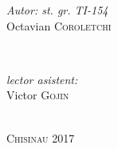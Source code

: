 \begin{titlepage}
\begin{center}
      \begin{minipage}{0.4\textwidth}
      \begin{flushleft} \large
      \emph{Autor: st. gr. TI-154}\\
      Octavian \textsc{Coroletchi}
      \end{flushleft}
      \end{minipage}
      ~
      \begin{minipage}{0.4\textwidth}
      \begin{flushright} \large
      \emph{lector asistent:} \\
      Victor \textsc{Gojin} \\ %
      \end{flushright}
      \end{minipage}\\[70mm]
	
      
      
      \textsc{Chisinau 2017}

      \vfill %
      \end{center}
      
\end{titlepage}
